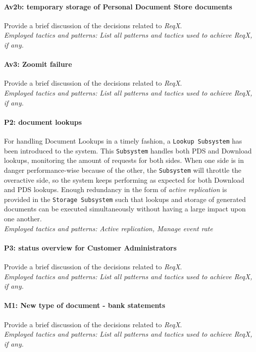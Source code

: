 \documentclass[a4paper,10pt]{article}
\begin{document}
\paragraph{Av2b\@: temporary storage of Personal Document Store documents} Provide a brief discussion of the decisions related to \emph{ReqX}.\\
\emph{Employed tactics and patterns: List all patterns and tactics used to
    achieve ReqX, if any.}
    
\paragraph{Av3\@: Zoomit failure} Provide a brief discussion of the
decisions related to \emph{ReqX}.\\
\emph{Employed tactics and patterns: List all patterns and tactics used to
    achieve ReqX, if any.}
    
\paragraph{P2\@: document lookups}
For handling Document Lookups in a timely fashion, a \texttt{Lookup Subsystem} has been introduced to the system. This \texttt{Subsystem} handles both PDS and Download lookups, monitoring the amount of requests for both sides. When one side is in danger performance-wise because of the other, the \texttt{Subsystem} will throttle the overactive side, so the system keeps performing as expected for both Download and PDS lookups. Enough redundancy in the form of \emph{active replication} is provided in the \texttt{Storage Subsystem} such that lookups and storage of generated documents can be executed simultaneously without having a large impact upon one another.\\
\emph{Employed tactics and patterns: Active replication, Manage event rate}
    
\paragraph{P3\@: status overview for Customer Administrators} Provide a brief discussion of the
decisions related to \emph{ReqX}.\\
\emph{Employed tactics and patterns: List all patterns and tactics used to
    achieve ReqX, if any.}
    
\paragraph{M1\@: New type of document - bank statements} Provide a brief discussion of the
decisions related to \emph{ReqX}.\\
\emph{Employed tactics and patterns: List all patterns and tactics used to
    achieve ReqX, if any.}
    
\end{document}
